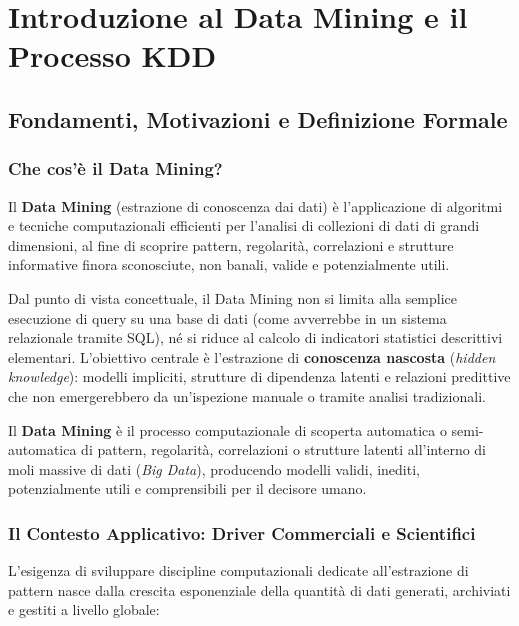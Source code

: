 \chapter{Introduzione al Data Mining e il Processo KDD}
\label{ch:intro-data-mining}

\FloatBarrier
\section{Fondamenti, Motivazioni e Definizione Formale}

\FloatBarrier
\subsection{Che cos'\`e il Data Mining?}
Il \textbf{Data Mining} (estrazione di conoscenza dai dati) \`e l'applicazione di algoritmi e tecniche computazionali efficienti per l'analisi di collezioni di dati di grandi dimensioni, al fine di scoprire pattern, regolarit\`a, correlazioni e strutture informative finora sconosciute, non banali, valide e potenzialmente utili.

Dal punto di vista concettuale, il Data Mining non si limita alla semplice esecuzione di query su una base di dati (come avverrebbe in un sistema relazionale tramite SQL), n\'e si riduce al calcolo di indicatori statistici descrittivi elementari. L'obiettivo centrale \`e l'estrazione di \textbf{conoscenza nascosta} (\textit{hidden knowledge}): modelli impliciti, strutture di dipendenza latenti e relazioni predittive che non emergerebbero da un'ispezione manuale o tramite analisi tradizionali.

\begin{definition}
Il \textbf{Data Mining} \`e il processo computazionale di scoperta automatica o semi-automatica di pattern, regolarit\`a, correlazioni o strutture latenti all'interno di moli massive di dati (\textit{Big Data}), producendo modelli validi, inediti, potenzialmente utili e comprensibili per il decisore umano.
\end{definition}

\FloatBarrier
\subsection{Il Contesto Applicativo: Driver Commerciali e Scientifici}
L'esigenza di sviluppare discipline computazionali dedicate all'estrazione di pattern nasce dalla crescita esponenziale della quantit\`a di dati generati, archiviati e gestiti a livello globale:

